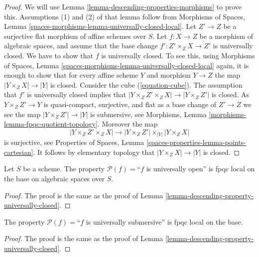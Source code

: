 \begin{proof}
We will use
Lemma \ref{lemma-descending-properties-morphisms}
to prove this. Assumptions (1) and (2) of that lemma follow from
Morphisms of Spaces,
Lemma \ref{spaces-morphisms-lemma-universally-closed-local}.
Let $Z' \to Z$ be a surjective flat morphism of affine schemes over $S$.
Let $f : X \to Z$ be a morphism of algebraic spaces, and assume
that the base change $f' : Z' \times_Z X \to Z'$ is universally closed.
We have to show that $f$ is universally closed. To see this, using
Morphisms of Spaces,
Lemma \ref{spaces-morphisms-lemma-universally-closed-local}
again, it is enough to show that for every affine scheme $Y$ and
morphism $Y \to Z$ the map $|Y \times_Z X| \to |Y|$ is closed.
Consider the cube (\ref{equation-cube}).
The assumption that $f'$ is universally closed implies that
$|Y \times_Z Z' \times_Z X| \to |Y \times_Z Z'|$ is closed.
As $Y \times_Z Z' \to Y$ is quasi-compact, surjective, and flat
as a base change of $Z' \to Z$
we see the map $|Y \times_Z Z'| \to |Y|$ is submersive, see
Morphisms, Lemma \ref{morphisms-lemma-fpqc-quotient-topology}.
Moreover the map
$$
|Y \times_Z Z' \times_Z X|
\longrightarrow
|Y \times_Z Z'| \times_{|Y|} |Y \times_Z X|
$$
is surjective, see
Properties of Spaces, Lemma \ref{spaces-properties-lemma-points-cartesian}.
It follows by elementary topology that $|Y \times_Z X| \to |Y|$ is closed.
\end{proof}

\begin{lemma}
\label{lemma-descending-property-universally-open}
Let $S$ be a scheme.
The property $\mathcal{P}(f) =$``$f$ is universally open''
is fpqc local on the base on algebraic spaces over $S$.
\end{lemma}

\begin{proof}
The proof is the same as the proof of
Lemma \ref{lemma-descending-property-universally-closed}.
\end{proof}

\begin{lemma}
\label{lemma-descending-property-universally-submersive}
The property $\mathcal{P}(f) =$``$f$ is universally submersive''
is fpqc local on the base.
\end{lemma}

\begin{proof}
The proof is the same as the proof of
Lemma \ref{lemma-descending-property-universally-closed}.
\end{proof}

